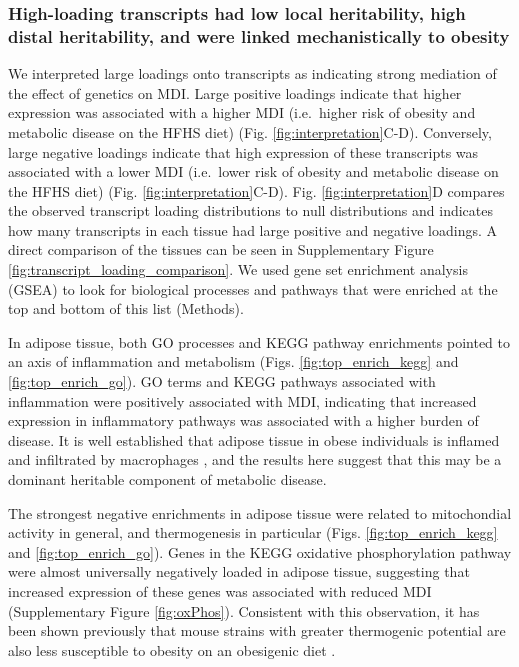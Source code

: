 \documentclass[
]{article}
\begin{document}
\subsubsection{High-loading transcripts had low local heritability, high
distal heritability, and were linked mechanistically to
obesity}\label{high-loading-transcripts-had-low-local-heritability-high-distal-heritability-and-were-linked-mechanistically-to-obesity}

We interpreted large loadings onto transcripts as indicating strong
mediation of the effect of genetics on MDI. Large positive loadings
indicate that higher expression was associated with a higher MDI
(i.e.~higher risk of obesity and metabolic disease on the HFHS diet)
(Fig. \ref{fig:interpretation}C-D). Conversely, large negative loadings
indicate that high expression of these transcripts was associated with a
lower MDI (i.e.~lower risk of obesity and metabolic disease on the HFHS
diet) (Fig. \ref{fig:interpretation}C-D). Fig. \ref{fig:interpretation}D
compares the observed transcript loading distributions to null
distributions and indicates how many transcripts in each tissue had
large positive and negative loadings. A direct comparison of the tissues
can be seen in Supplementary Figure
\ref{fig:transcript_loading_comparison}. We used gene set enrichment
analysis (GSEA) \cite{fgsea, 
pmid16199517} to look for biological processes and pathways that were
enriched at the top and bottom of this list (Methods).

In adipose tissue, both GO processes and KEGG pathway enrichments
pointed to an axis of inflammation and metabolism (Figs.
\ref{fig:top_enrich_kegg} and \ref{fig:top_enrich_go}). GO terms and
KEGG pathways associated with inflammation were positively associated
with MDI, indicating that increased expression in inflammatory pathways
was associated with a higher burden of disease. It is well established
that adipose tissue in obese individuals is inflamed and infiltrated by
macrophages \cite{pmid19133410, 
pmid28955384, pmid28912810, pmid28901330, pmid24969772}, and the results
here suggest that this may be a dominant heritable component of
metabolic disease.

The strongest negative enrichments in adipose tissue were related to
mitochondial activity in general, and thermogenesis in particular (Figs.
\ref{fig:top_enrich_kegg} and \ref{fig:top_enrich_go}). Genes in the
KEGG oxidative phosphorylation pathway were almost universally
negatively loaded in adipose tissue, suggesting that increased
expression of these genes was associated with reduced MDI (Supplementary
Figure \ref{fig:oxPhos}). Consistent with this observation, it has been
shown previously that mouse strains with greater thermogenic potential
are also less susceptible to obesity on an obesigenic diet
\cite{pmid18492779}.
\end{document}
